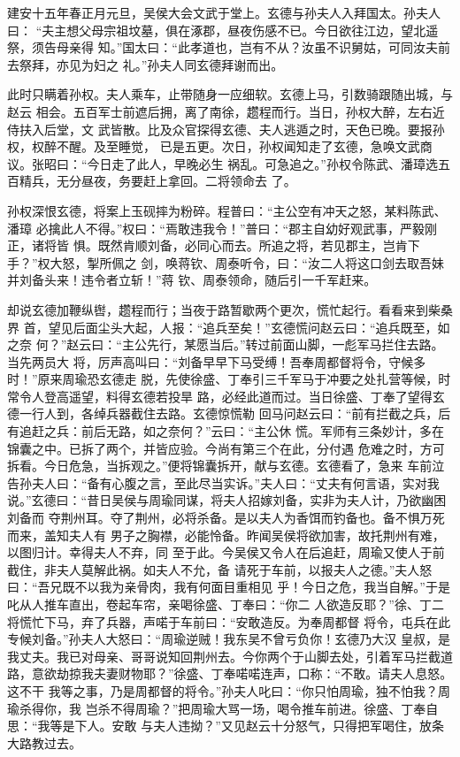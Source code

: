 建安十五年春正月元旦，吴侯大会文武于堂上。玄德与孙夫人入拜国太。孙夫人曰：
“夫主想父母宗祖坟墓，俱在涿郡，昼夜伤感不已。今日欲往江边，望北遥祭，须告母亲得
知。”国太曰：“此孝道也，岂有不从？汝虽不识舅姑，可同汝夫前去祭拜，亦见为妇之
礼。”孙夫人同玄德拜谢而出。

此时只瞒着孙权。夫人乘车，止带随身一应细软。玄德上马，引数骑跟随出城，与赵云
相会。五百军士前遮后拥，离了南徐，趱程而行。当日，孙权大醉，左右近侍扶入后堂，文
武皆散。比及众官探得玄德、夫人逃遁之时，天色已晚。要报孙权，权醉不醒。及至睡觉，
已是五更。次日，孙权闻知走了玄德，急唤文武商议。张昭曰：“今日走了此人，早晚必生
祸乱。可急追之。”孙权令陈武、潘璋选五百精兵，无分昼夜，务要赶上拿回。二将领命去
了。

孙权深恨玄德，将案上玉砚摔为粉碎。程普曰：“主公空有冲天之怒，某料陈武、潘璋
必擒此人不得。”权曰：“焉敢违我令！”普曰：“郡主自幼好观武事，严毅刚正，诸将皆
惧。既然肯顺刘备，必同心而去。所追之将，若见郡主，岂肯下手？”权大怒，掣所佩之
剑，唤蒋钦、周泰听令，曰：“汝二人将这口剑去取吾妹并刘备头来！违令者立斩！”蒋
钦、周泰领命，随后引一千军赶来。

却说玄德加鞭纵辔，趱程而行；当夜于路暂歇两个更次，慌忙起行。看看来到柴桑界
首，望见后面尘头大起，人报：“追兵至矣！”玄德慌问赵云曰：“追兵既至，如之奈
何？”赵云曰：“主公先行，某愿当后。”转过前面山脚，一彪军马拦住去路。当先两员大
将，厉声高叫曰：“刘备早早下马受缚！吾奉周都督将令，守候多时！”原来周瑜恐玄德走
脱，先使徐盛、丁奉引三千军马于冲要之处扎营等候，时常令人登高遥望，料得玄德若投旱
路，必经此道而过。当日徐盛、丁奉了望得玄德一行人到，各绰兵器截住去路。玄德惊慌勒
回马问赵云曰：“前有拦截之兵，后有追赶之兵：前后无路，如之奈何？”云曰：“主公休
慌。军师有三条妙计，多在锦囊之中。已拆了两个，并皆应验。今尚有第三个在此，分付遇
危难之时，方可拆看。今日危急，当拆观之。”便将锦囊拆开，献与玄德。玄德看了，急来
车前泣告孙夫人曰：“备有心腹之言，至此尽当实诉。”夫人曰：“丈夫有何言语，实对我
说。”玄德曰：“昔日吴侯与周瑜同谋，将夫人招嫁刘备，实非为夫人计，乃欲幽困刘备而
夺荆州耳。夺了荆州，必将杀备。是以夫人为香饵而钓备也。备不惧万死而来，盖知夫人有
男子之胸襟，必能怜备。昨闻吴侯将欲加害，故托荆州有难，以图归计。幸得夫人不弃，同
至于此。今吴侯又令人在后追赶，周瑜又使人于前截住，非夫人莫解此祸。如夫人不允，备
请死于车前，以报夫人之德。”夫人怒曰：“吾兄既不以我为亲骨肉，我有何面目重相见
乎！今日之危，我当自解。”于是叱从人推车直出，卷起车帘，亲喝徐盛、丁奉曰：“你二
人欲造反耶？”徐、丁二将慌忙下马，弃了兵器，声喏于车前曰：“安敢造反。为奉周都督
将令，屯兵在此专候刘备。”孙夫人大怒曰：“周瑜逆贼！我东吴不曾亏负你！玄德乃大汉
皇叔，是我丈夫。我已对母亲、哥哥说知回荆州去。今你两个于山脚去处，引着军马拦截道
路，意欲劫掠我夫妻财物耶？”徐盛、丁奉喏喏连声，口称：“不敢。请夫人息怒。这不干
我等之事，乃是周都督的将令。”孙夫人叱曰：“你只怕周瑜，独不怕我？周瑜杀得你，我
岂杀不得周瑜？”把周瑜大骂一场，喝令推车前进。徐盛、丁奉自思：“我等是下人。安敢
与夫人违拗？”又见赵云十分怒气，只得把军喝住，放条大路教过去。

